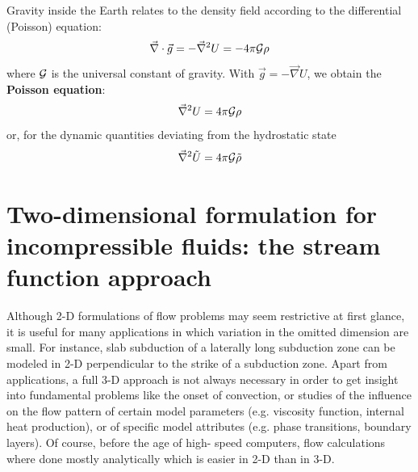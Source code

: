 Gravity inside the Earth relates to the density field according to the differential (Poisson) equation:
\begin{equation}
\vec\nabla \cdot \vec{g} = - \vec\nabla^2 U = -4\pi {\cal G} \rho
\end{equation}
where ${\cal G}$ is the universal constant of gravity. With $\vec{g}=-\vec\nabla U$, 
we obtain the {\bf Poisson equation}:
\begin{equation}
\vec\nabla^2 U = 4\pi {\cal G} \rho
\label{eq:md35}
\end{equation}
or, for the dynamic quantities deviating from the hydrostatic state
\begin{equation}
\vec\nabla^2 {\tilde U} = 4\pi {\cal G} {\tilde \rho}
\label{eq:md36}
\end{equation}


\vspace{0.5cm}
\vspace{0.5cm}

\section{Two-dimensional formulation for incompressible fluids: 
the stream function approach} \label{ss:vorticitystreamfunction}

Although 2-D formulations of flow problems may seem restrictive at first glance, it is
useful for many applications in which variation in the omitted dimension are small. For
instance, slab subduction of a laterally long subduction zone can be modeled in 2-D
perpendicular to the strike of a subduction zone. Apart from applications, a full 3-D
approach is not always necessary in order to get insight into fundamental problems like
the onset of convection, or studies of the influence on the flow pattern of certain model
parameters (e.g. viscosity function, internal heat production), or of specific model
attributes (e.g. phase transitions, boundary layers). Of course, before the age of high-
speed computers, flow calculations where done mostly analytically which is easier in 2-D
than in 3-D.

